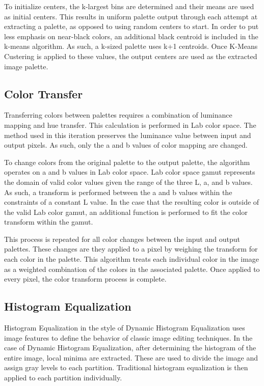 \documentclass[sigchi]{acmart}
\begin{document}
To initialize centers, the k-largest bins are determined and their means are used as initial centers. This results in uniform palette output through each attempt at extracting a palette, as opposed to using random centers to start. In order to put less emphasis on near-black colors, an additional black centroid is included in the k-means algorithm. As such, a k-sized palette uses k+1 centroids. Once K-Means Custering is applied to these values, the output centers are used as the extracted image palette.

\subsection{Color Transfer}

Transferring colors between palettes requires a combination of luminance mapping and hue transfer. This calculation is performed in Lab color space. The method used in this iteration preserves the luminance value between input and output pixels. As such, only the a and b values of color mapping are changed.

To change colors from the original palette to the output palette, the algorithm operates on a and b values in Lab color space. Lab color space gamut represents the domain of valid color values given the range of the three L, a, and b values. As such, a transform is performed between the a and b values within the constraints of a constant L value. In the case that the resulting color is outside of the valid Lab color gamut, an additional function is performed to fit the color transform within the gamut.

This process is repeated for all color changes between the input and output palettes. These changes are they applied to a pixel by weighing the transform for each color in the palette. This algorithm treats each individual color in the image as a weighted combination of the colors in the associated palette. Once applied to every pixel, the color transform process is complete.

\subsection{Histogram Equalization}

Histogram Equalization in the style of Dynamic Histogram Equalization uses image features to define the behavior of classic image editing techniques. In the case of Dynamic Histogram Equalization, after determining the histogram of the entire image, local minima are extracted. These are used to divide the image and assign gray levels to each partition. Traditional histogram equalization is then applied to each partition individually.
\end{document}
